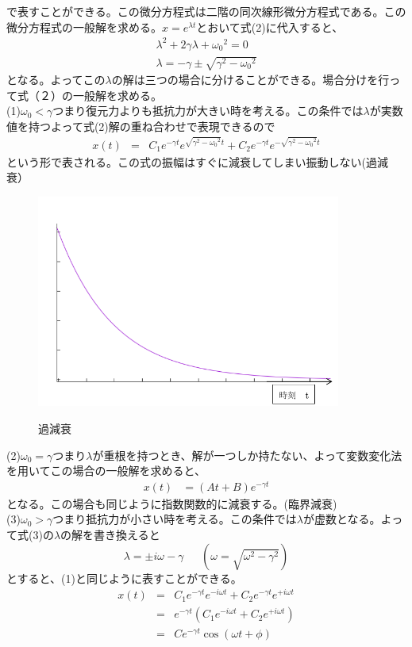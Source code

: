 で表すことができる。この微分方程式は二階の同次線形微分方程式である。この微分方程式の一般解を求める。$x=e^{\lambda t}$とおいて式(2)に代入すると、
\begin{eqnarray}
{\lambda}^2+2\gamma \lambda+{\omega_0}^2 = 0 \nonumber \\
\lambda = -\gamma \pm \sqrt{{\gamma}^2-{\omega_0}^2}
\end{eqnarray}
となる。よってこの$\lambda$の解は三つの場合に分けることができる。場合分けを行って式（２）の一般解を求める。\\
(1)$\omega_0 < \gamma$つまり復元力よりも抵抗力が大きい時を考える。この条件では$\lambda$が実数値を持つよって式(2)解の重ね合わせで表現できるので
\begin{eqnarray}
x(t)&=&C_1e^{-\gamma t}e^{\sqrt{{\gamma}^2-{\omega_0}^2}t}+C_2e^{-\gamma t}e^{-\sqrt{{\gamma}^2-{\omega_0}^2}t}
\end{eqnarray}
という形で表される。この式の振幅はすぐに減衰してしまい振動しない(過減衰）\\
\begin{figure}[H]
\centering
\includegraphics[height=7cm,clip]{kadono/image/gensui.pdf}
\label{fig:ele1}
\caption{過減衰}
\end{figure}
(2)$\omega_0 = \gamma$つまり$\lambda$が重根を持つとき、解が一つしか持たない、よって変数変化法を用いてこの場合の一般解を求めると、
\begin{eqnarray}
x(t)&=(At+B)e^{-\gamma t}
\end{eqnarray}
となる。この場合も同じように指数関数的に減衰する。(臨界減衰)\\
(3)$\omega_0 > \gamma$つまり抵抗力が小さい時を考える。この条件では$\lambda$が虚数となる。よって式(3)の$\lambda$の解を書き換えると
\[
\lambda = \pm i\omega - \gamma  \ \ \ \ \ \ \  (\omega= \sqrt{\omega^2-\gamma^2})
\]
とすると、(1)と同じように表すことができる。
\begin{eqnarray}
x(t)	&=&C_1e^{-\gamma t}e^{-i\omega t}+C_2e^{-\gamma t}e^{+i\omega t} \nonumber\\
	&=&e^{-\gamma t}(C_1e^{-i\omega t}+C_2e^{+i\omega t})\nonumber\\
	&=&Ce^{-\gamma t}\cos (\omega t +\phi)
\end{eqnarray}
